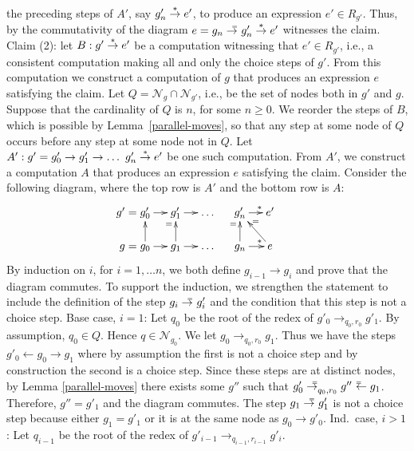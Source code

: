 \documentclass{mytlp}
\newcommand{\nodes}{\ensuremath{\mathcal{N}}}
\newcommand{\tostar}{\buildrel * \over \to}
\newcommand{\toequal}{\to^{\llap{\raisebox{.3ex}{\tiny $=$}}}}
\newcommand{\leftequal}{{}^{\rlap{\ \raisebox{.3ex}{\tiny $=$}}}\leftarrow}
\newcommand{\rep}{R}
\begin{document}
{{the preceding steps of $A'$, say $g'_n \tostar e'$,
to produce an expression $e' \in \rep_{g'}$.
Thus, by the commutativity of the diagram
$e = g_n \toequal g'_n \tostar e'$ witnesses the claim.
\\[1ex]
Claim (2):
let $B: g' \tostar e'$ be a computation
witnessing that $e' \in \rep_{g'}$, i.e., a consistent
computation making all and only the choice steps of $g'$.
From this computation we construct a computation of $g$
that produces an expression $e$ satisfying the claim.
Let $Q = \nodes_g \cap \nodes_{g'}$, i.e., be the set of nodes
both in $g'$ and $g$.
Suppose that the cardinality of $Q$ is $n$, for some $n \geqslant 0$.
We reorder the steps of $B$, which is possible by
Lemma~\ref{parallel-moves}, so that any step at some node of $Q$
occurs before any step at some node not in $Q$.
Let $A':g'=g'_0 \to g'_1 \to \ldots~  g'_n \tostar e'$ 
be one such computation.
From $A'$, we construct a computation $A$ that produces
an expression $e$ satisfying the claim.
Consider the following diagram, where the top row is $A'$
and the bottom row is $A$:
\begin{displaymath}
    \xymatrix@C=12pt@R=16pt{
      \llap{$g' = \;$} g'_0 \ar[r] & g'_1 \ar[r]
          & \ldots & g'_n \ar[r]^(.65){*} & e' \\
      \llap{$g =\;$} g_0 \ar[r] \ar[u] & g_1 \ar[r] \ar[u]^(.65)= 
          & \ldots & g_n \ar[r]^(.65){*} \ar[u]^(.65)= 
          & e \ar[ul]_(.6){\kern-.65ex =} \\
    }
\end{displaymath}
By induction on $i$, for $i=1,\ldots n$, we both
define $g_{i-1} \to g_i$ and prove that the diagram commutes.
To support the induction, we strengthen the statement to
include the definition of the step $g_i \toequal g'_i$ and
the condition that this step is not a choice step.
Base case, $i=1$: 
Let $q_0$ be the root of the redex of $g'_0 \to_{q_0,r_0} g'_1$.
By assumption, $q_0 \in Q$. Hence $q \in \nodes_{g_0}$.
We let $g_0 \to_{q_0,r_0} g_1$.
Thus we have the steps $g'_0 \leftarrow g_0 \to g_1$
where by assumption the first is not a choice step and
by construction the second is a choice step.
Since these steps are at distinct nodes, by
Lemma \ref{parallel-moves} there exists some $g''$ such that
$g'_0 \toequal_{q_0,r_0} g'' \leftequal g_1$.
Therefore, $g''=g'_1$ and the diagram commutes.
The step $g_1 \toequal g'_1$ is not a choice step because either 
$g_1 = g'_1$ or it is at the same node as $g_0 \to g'_0$.
Ind.~case, $i>1$:
Let $q_{i-1}$ be the root of the redex of 
$g'_{i-1} \to_{q_{i-1},r_{i-1}} g'_i$.
}}
\end{document}
